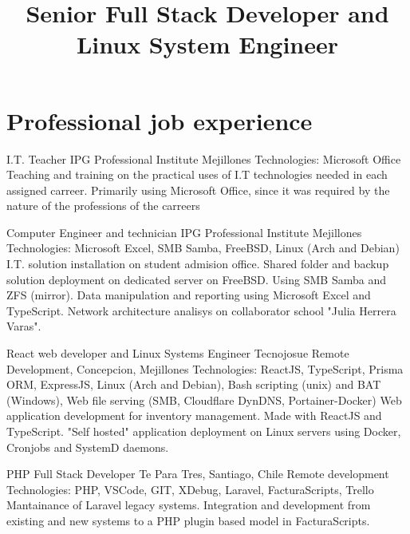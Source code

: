 \documentclass[draft,color,12pt,letterpaper,sans]{moderncv}
\title{Senior Full Stack Developer and Linux System Engineer}
\begin{document}
\makecvtitle %

\section{Professional job experience}

{I.T. Teacher}
{IPG Professional Institute}
{\newline Mejillones}
{\newline Technologies: Microsoft Office}
{Teaching and training on the practical uses of I.T technologies needed in each assigned carreer. Primarily using Microsoft Office, since it was required by the nature of the professions of the carreers \newline}

{Computer Engineer and technician}
{IPG Professional Institute}
{\newline Mejillones}
{\newline Technologies: Microsoft Excel, SMB Samba, FreeBSD, Linux (Arch and Debian)}
{I.T. solution installation on student admision office. \newline Shared folder and backup solution deployment on dedicated server on FreeBSD. Using SMB Samba and ZFS (mirror). \newline Data manipulation and reporting using Microsoft Excel and TypeScript. \newline Network architecture analisys on collaborator school "Julia Herrera Varas". \newline}

{React web developer and Linux Systems Engineer}
{Tecnojosue}
{\newline Remote Development, Concepcion, Mejillones}
{\newline Technologies: ReactJS, TypeScript, Prisma ORM, ExpressJS, Linux (Arch and Debian), Bash scripting (unix) and BAT (Windows), Web file serving (SMB, Cloudflare DynDNS, Portainer-Docker)}
{Web application development for inventory management. Made with ReactJS and TypeScript. \newline "Self hosted" application deployment on Linux servers using Docker, Cronjobs and SystemD daemons. \newline}

{PHP Full Stack Developer}
{Te Para Tres, Santiago, Chile}
{\newline Remote development}
{\newline Technologies: PHP, VSCode, GIT, XDebug, Laravel, FacturaScripts, Trello}
{Mantainance of Laravel legacy systems. Integration and development from existing and new systems to a PHP plugin based model in FacturaScripts.\newline}
\end{document}

